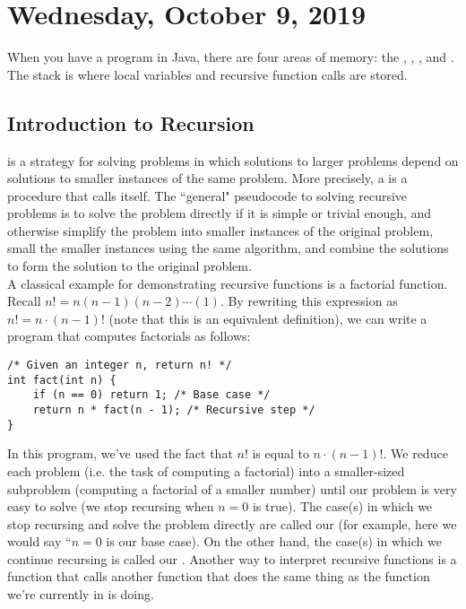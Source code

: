 \section{Wednesday, October 9, 2019}

When you have a program in Java, there are four areas of memory: the , , , and . The stack is where local variables and recursive function calls are stored.

\subsection{Introduction to Recursion}

 is a strategy for solving problems in which solutions to larger problems depend on solutions to smaller instances of the same problem. More precisely, a  is a procedure that calls itself. The ``general" pseudocode to solving recursive problems is to solve the problem directly if it is simple or trivial enough, and otherwise simplify the problem into smaller instances of the original problem, small the smaller instances using the same algorithm, and combine the solutions to form the solution to the original problem. \\

\noindent A classical example for demonstrating recursive functions is a factorial function. Recall $n! = n(n - 1)(n - 2)\cdots (1)$. By rewriting this expression as $n! = n \cdot (n - 1)!$ (note that this is an equivalent definition), we can write a program that computes factorials as follows:

\begin{lstlisting}
/* Given an integer n, return n! */
int fact(int n) {
    if (n == 0) return 1; /* Base case */
    return n * fact(n - 1); /* Recursive step */
}
\end{lstlisting}

\noindent In this program, we've used the fact that $n!$ is equal to $n \cdot (n - 1)!$. We reduce each problem (i.e. the task of computing a factorial) into a smaller-sized subproblem (computing a factorial of a smaller number) until our problem is very easy to solve (we stop recursing when $n = 0$ is true). The case(s) in which we stop recursing and solve the problem directly are called our  (for example, here we would say ``$n = 0$ is our base case). On the other hand, the case(s) in which we continue recursing is called our . Another way to interpret recursive functions is a function that calls another function that does the same thing as the function we're currently in is doing. \\

